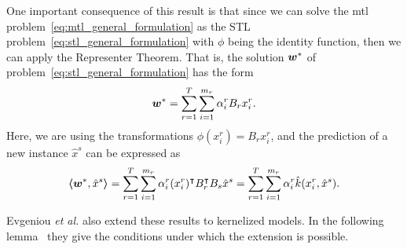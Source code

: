 One important consequence of this result is that since we can solve the \acrshort{mtl} problem~\eqref{eq:mtl_general_formulation} as the STL problem~\eqref{eq:stl_general_formulation} with $\phi$ being the identity function, then we can apply the {Representer Theorem}. That is, the solution ${\bm{w}}^*$ of problem~\eqref{eq:stl_general_formulation} has the form
\begin{equation}
    \nonumber
    {\bm{w}}^* = \sum_{r=1}^T \sum_{i=1}^{m_r} \alpha_i^r B_r x_i^r .
\end{equation}
Here, we are using the transformations $\phi(x_i^r) = B_r x_i^r$, and the prediction of a new instance $\hat{x}^s$ can be expressed as
\begin{equation}
    \nonumber
    \bm{\left\langle} {\bm{w}}^*, \hat{x}^s \bm{\right\rangle} = \sum_{r=1}^T \sum_{i=1}^{m_r} \alpha_i^r  (x_i^r)^\intercal B_r^\intercal B_s \hat{x}^s = \sum_{r=1}^T \sum_{i=1}^{m_r} \alpha_i^r  \hat{k}(x_i^r, \hat{x}^s).
\end{equation}

Evgeniou \emph{et al.} also extend these results to kernelized models. In the following lemma~\cite[Lemma 2]{EvgeniouMP05} they give the conditions under which the extension is possible.

